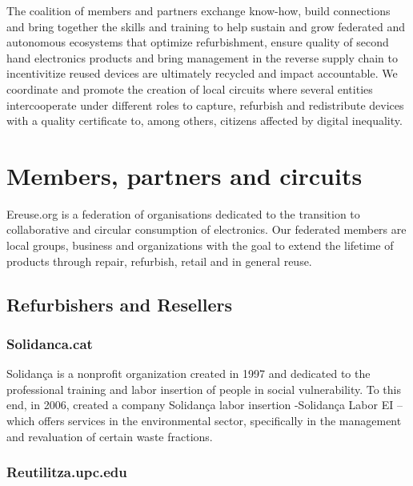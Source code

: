 \documentclass[
]{book}
\begin{document}
The coalition of members and partners exchange know-how, build connections and bring together the skills and training to help sustain and grow federated and autonomous ecosystems that optimize refurbishment, ensure quality of second hand electronics products and bring management in the reverse supply chain to incentivitize reused devices are ultimately recycled and impact accountable. We coordinate and promote the creation of local circuits where several entities intercooperate under different roles to capture, refurbish and redistribute devices with a quality certificate to, among others, citizens affected by digital inequality.

\hypertarget{members-partners-and-circuits}{%
\section{Members, partners and circuits}\label{members-partners-and-circuits}}

Ereuse.org is a federation of organisations dedicated to the transition to collaborative and circular consumption of electronics. Our federated members are local groups, business and organizations with the goal to extend the lifetime of products through repair, refurbish, retail and in general reuse.

\hypertarget{refurbishers-and-resellers}{%
\subsection{Refurbishers and Resellers}\label{refurbishers-and-resellers}}

\hypertarget{solidanca.cat}{%
\subsubsection{Solidanca.cat}\label{solidanca.cat}}

Solidança is a nonprofit organization created in 1997 and dedicated to the professional training and labor insertion of people in social vulnerability. To this end, in 2006, created a company Solidança labor insertion -Solidança Labor EI -- which offers services in the environmental sector, specifically in the management and revaluation of certain waste fractions.

\hypertarget{reutilitza.upc.edu}{%
\subsubsection{Reutilitza.upc.edu}\label{reutilitza.upc.edu}}
\end{document}
